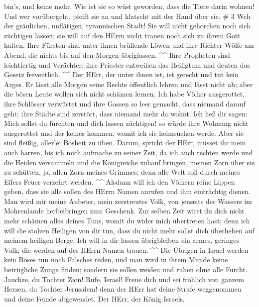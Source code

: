 bin's, und keine mehr. Wie ist sie so wüst geworden, dass die Tiere
darin wohnen! Und wer vorübergeht, pfeift sie an und klatscht mit der
Hand über sie. \# 3  Weh der gräulichen, unflätigen,
tyrannischen Stadt!  Sie will nicht gehorchen noch sich
züchtigen lassen; sie will auf den HErrn nicht trauen noch sich zu ihrem
Gott halten.  Ihre Fürsten sind unter ihnen brüllende Löwen
und ihre Richter Wölfe am Abend, die nichts bis auf den Morgen
übriglassen. \^{}\^{}  Ihre Propheten sind leichtfertig und
Verächter; ihre Priester entweihen das Heiligtum und deuten das Gesetz
freventlich. \^{}\^{}  Der HErr, der unter ihnen ist, ist
gerecht und tut kein Arges. Er lässt alle Morgen seine Rechte öffentlich
lehren und lässt nicht ab; aber die bösen Leute wollen sich nicht
schämen lernen.  Ich habe Völker ausgerottet, ihre Schlösser
verwüstet und ihre Gassen so leer gemacht, dass niemand darauf geht;
ihre Städte sind zerstört, dass niemand mehr da wohnt.  Ich
ließ dir sagen: Mich sollst du fürchten und dich lassen züchtigen! so
würde ihre Wohnung nicht ausgerottet und der keines kommen, womit ich
sie heimsuchen werde. Aber sie sind fleißig, allerlei Bosheit zu üben.
 Darum, spricht der HErr, müsset ihr mein auch harren, bis
ich mich aufmache zu seiner Zeit, da ich auch rechten werde und die
Heiden versammeln und die Königreiche zuhauf bringen, meinen Zorn über
sie zu schütten, ja, allen Zorn meines Grimmes; denn alle Welt soll
durch meines Eifers Feuer verzehrt werden. \^{}\^{}  Alsdann
will ich den Völkern reine Lippen geben, dass sie alle sollen des HErrn
Namen anrufen und ihm einträchtig dienen.  Man wird mir
meine Anbeter, mein zerstreutes Volk, von jenseits des Wassers im
Mohrenlande herbeibringen zum Geschenk.  Zur selben Zeit
wirst du dich nicht mehr schämen alles deines Tuns, womit du wider mich
übertreten hast; denn ich will die stolzen Heiligen von dir tun, dass du
nicht mehr sollst dich überheben auf meinem heiligen Berge.
 Ich will in dir lassen übrigbleiben ein armes, geringes
Volk; die werden auf des HErrn Namen trauen. \^{}\^{}  Die
Übrigen in Israel werden kein Böses tun noch Falsches reden, und man
wird in ihrem Munde keine betrügliche Zunge finden; sondern sie sollen
weiden und ruhen ohne alle Furcht.  Jauchze, du Tochter
Zion! Rufe, Israel! Freue dich und sei fröhlich von ganzem Herzen, du
Tochter Jerusalem!  denn der HErr hat deine Strafe
weggenommen und deine Feinde abgewendet. Der HErr, der König Israels,
